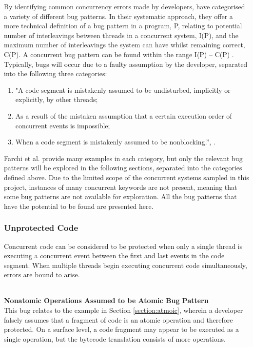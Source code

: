 \documentclass[a4paper,12pt]{article}
\begin{document}
By identifying common concurrency errors made by developers, \citeauthor{farchi03} have categorised a variety of different bug patterns. In their systematic approach, they offer a more technical definition of a bug pattern in a program, P, relating to potential number of interleavings between threads in a concurrent system, I(P), and the maximum number of interleavings the system can have whilst remaining correct, C(P). A concurrent bug pattern can be found within the range I(P) – C(P) \citeauthor{farchi03}. Typically, bugs will occur due to a faulty assumption by the developer, separated into the following three categories: 

\begin{enumerate}
    \item "A code segment is mistakenly assumed to be undisturbed, implicitly or explicitly, by other threads;
    \item As a result of the mistaken assumption that a certain execution order of concurrent events is impossible;
    \item When a code segment is mistakenly assumed to be nonblocking.”, \citep{farchi03}.
\end{enumerate}

Farchi et al. provide many examples in each category, but only the relevant bug patterns will be explored in the following sections, separated into the categories defined above. Due to the limited scope of the concurrent systems sampled in this project, instances of many concurrent keywords are not present, meaning that some bug patterns are not available for exploration. All the bug patterns that have the potential to be found are presented here.        

    
\subsubsection{Unprotected Code}
Concurrent code can be considered to be protected when only a single thread is executing a concurrent event between the first and last events in the code segment. When multiple threads begin executing concurrent code simultaneously, errors are bound to arise.   

\textbf{\\Nonatomic Operations Assumed to be Atomic Bug Pattern} 
\\This bug relates to the example in Section \ref{section:atmoic}, wherein a developer falsely assumes that a fragment of code is an atomic operation and therefore protected. On a surface level, a code fragment may appear to be executed as a single operation, but the bytecode translation consists of more operations.
\end{document}
